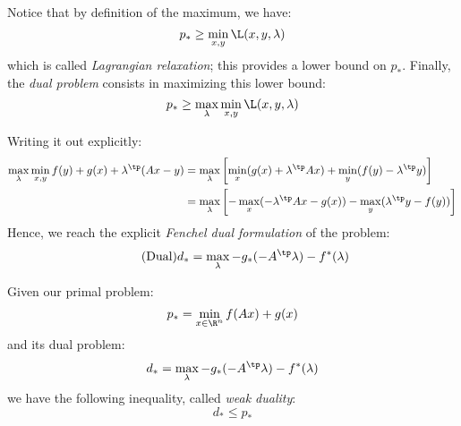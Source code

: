 Notice that by definition of the maximum, we have:
\begin{equation*}
    p_* \geq \min_{x, y} \L(x, y, \lambda)
\end{equation*}
which is called \emph{Lagrangian relaxation}; this provides a lower bound on $p_*$. Finally, the \emph{dual problem} consists in maximizing this lower bound:
\begin{equation}
    p_* \geq \max_{\lambda} \min_{x, y} \L(x, y, \lambda)
\end{equation}

Writing it out explicitly:
\begin{align*}
    \max_\lambda\min_{x,y} f(y)+g(x)+\lambda^\tp(Ax-y) &= \max_\lambda\left[\min_x (g(x)+\lambda^\tp Ax) +\min_y (f(y)-\lambda^\tp y)\right]\\
    &= \max_\lambda\left[-\max_x(-\lambda^\tp Ax-g(x))-\max_y(\lambda^\tp y-f(y))\right]
\end{align*}
Hence, we reach the explicit \emph{Fenchel dual formulation} of the problem:
\begin{equation}
    \label{eq:dual}
    \tag{Dual}
    d_* = \max_\lambda -g_*(-A^\tp\lambda)-f^*(\lambda)
\end{equation}

\begin{property}
    Given our primal problem:
    \begin{equation*}
        p_* = \min_{x\in\R^n} f(Ax)+g(x)
    \end{equation*}
    and its dual problem:
    \begin{equation*}
        d_* = \max_\lambda -g_*(-A^\tp\lambda)-f^*(\lambda)
    \end{equation*}
    we have the following inequality, called \emph{weak duality}:
    \begin{equation}
        d_*\leq p_*
    \end{equation}
\end{property}

